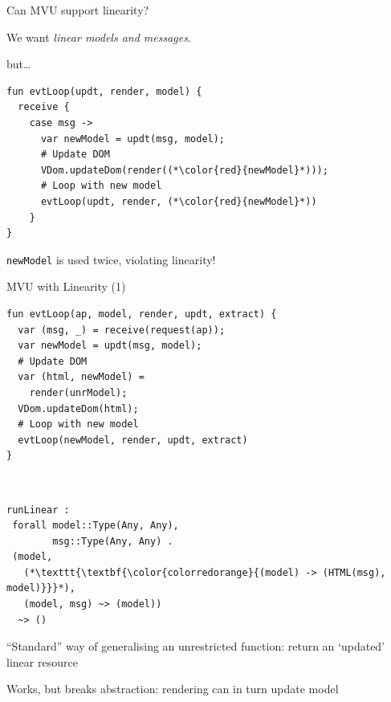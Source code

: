 \documentclass[11.5pt, aspectratio=169]{beamer}
\begin{document}
\begin{frame}[fragile]{Can MVU support linearity?}

  \begin{fullpageitemize}
  \item We want \emph{linear models and messages}.
    \begin{itemize}
      \itemR but\ldots
    \end{itemize}
  \end{fullpageitemize}

  \begin{lstlisting}[language=links]
fun evtLoop(updt, render, model) {
  receive {
    case msg ->
      var newModel = updt(msg, model);
      # Update DOM
      VDom.updateDom(render((*\color{red}{newModel}*)));
      # Loop with new model
      evtLoop(updt, render, (*\color{red}{newModel}*))
    }
}
  \end{lstlisting}

  \begin{fullpageitemize}
    \item \texttt{newModel} is used twice, violating linearity!
  \end{fullpageitemize}
\end{frame}

\begin{frame}[fragile]{MVU with Linearity (1)}

\begin{minipage}{0.55\textwidth}
  \begin{lstlisting}[language=links]
fun evtLoop(ap, model, render, updt, extract) {
  var (msg, _) = receive(request(ap));
  var newModel = updt(msg, model);
  # Update DOM
  var (html, newModel) =
    render(unrModel);
  VDom.updateDom(html);
  # Loop with new model
  evtLoop(newModel, render, updt, extract)
}
  \end{lstlisting}
\end{minipage}
~
\begin{minipage}{0.42\textwidth}
  \begin{lstlisting}[numbers=none, backgroundcolor=\color{white}]
runLinear :
 forall model::Type(Any, Any),
        msg::Type(Any, Any) .
 (model,
   (*\texttt{\textbf{\color{colorredorange}{(model) -> (HTML(msg), model)}}}*),
   (model, msg) ~> (model))
  ~> ()
\end{lstlisting}
\end{minipage}

  \begin{fullpageitemize}
  \item ``Standard'' way of generalising an unrestricted function: return an `updated' linear resource
  \item Works, but breaks abstraction: rendering can in turn update model
  \end{fullpageitemize}
\end{frame}
\end{document}
